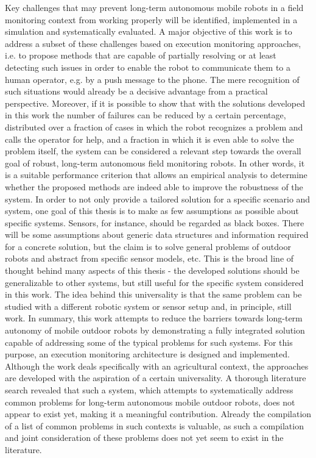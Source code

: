 \documentclass[english, master, utf8]{base/thesis_KBS}
\begin{document}
\noindent
Key challenges that may prevent long-term autonomous mobile robots in a field monitoring context from working properly will be identified, implemented 
in a simulation and systematically evaluated. A major objective of this work is to address a subset of these challenges based on execution monitoring approaches,
i.e. to propose methods that are capable of partially resolving or at least detecting such issues in order to enable the robot to communicate them to a human operator,
e.g. by a push message to the phone. The mere recognition of such situations would already be a decisive advantage from a practical perspective. Moreover, if it is possible
to show that with the solutions developed in this work the number of failures can be reduced by a certain percentage, distributed over a fraction of cases in which the robot 
recognizes a problem and calls the operator for help, and a fraction in which it is even able to solve the problem itself, the system can be considered a relevant step towards 
the overall goal of robust, long-term autonomous field monitoring robots. In other words, it is a suitable performance criterion that allows an empirical analysis to
determine whether the proposed methods are indeed able to improve the robustness of the system. In order to not only provide a tailored solution for a specific scenario and system,
one goal of this thesis is to make as few assumptions as possible about specific systems. Sensors, for instance, should be regarded as black boxes. There will be some assumptions
about generic data structures and information required for a concrete solution, but the claim is to solve general problems of outdoor robots and abstract from specific sensor models,
etc. This is the broad line of thought behind many aspects of this thesis - the developed solutions should be generalizable to other systems, but still useful for the specific
system considered in this work. The idea behind this universality is that the same problem can be studied with a different robotic system or sensor setup and, in principle, still
work. In summary, this work attempts to reduce the barriers towards long-term autonomy of mobile outdoor robots by demonstrating a fully integrated solution capable of
addressing some of the typical problems for such systems. For this purpose, an execution monitoring architecture is designed and implemented. Although the work deals specifically with
an agricultural context, the approaches are developed with the aspiration of a certain universality. A thorough literature search revealed that such a system, which attempts to
systematically address common problems for long-term autonomous mobile outdoor robots, does not appear to exist yet, making it a meaningful contribution. Already the compilation of
a list of common problems in such contexts is valuable, as such a compilation and joint consideration of these problems does not yet seem to exist in the literature.\newline
\end{document}
